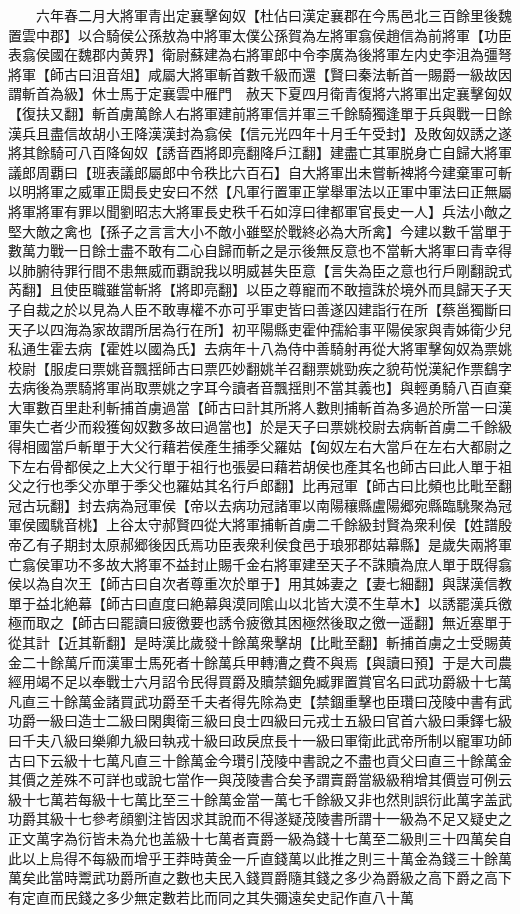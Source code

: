 　　六年春二月大將軍青出定襄擊匈奴【杜佔曰漢定襄郡在今馬邑北三百餘里後魏置雲中郡】以合騎侯公孫敖為中將軍太僕公孫賀為左將軍翕侯趙信為前將軍【功臣表翕侯國在魏郡内黄界】衛尉蘇建為右將軍郎中令李廣為後將軍左内史李沮為彊弩將軍【師古曰沮音俎】咸屬大將軍斬首數千級而還【賢曰秦法斬首一賜爵一級故因謂斬首為級】休士馬于定襄雲中雁門　赦天下夏四月衛青復將六將軍出定襄擊匈奴【復扶又翻】斬首虜萬餘人右將軍建前將軍信并軍三千餘騎獨逢單于兵與戰一日餘漢兵且盡信故胡小王降漢漢封為翕侯【信元光四年十月壬午受封】及敗匈奴誘之遂將其餘騎可八百降匈奴【誘音酉將即亮翻降戶江翻】建盡亡其軍脱身亡自歸大將軍議郎周覇曰【班表議郎屬郎中令秩比六百石】自大將軍出未嘗斬裨將今建棄軍可斬以明將軍之威軍正閎長史安曰不然【凡軍行置軍正掌舉軍法以正軍中軍法曰正無屬將軍將軍有罪以聞劉昭志大將軍長史秩千石如淳曰律都軍官長史一人】兵法小敵之堅大敵之禽也【孫子之言言大小不敵小雖堅於戰終必為大所禽】今建以數千當單于數萬力戰一日餘士盡不敢有二心自歸而斬之是示後無反意也不當斬大將軍曰青幸得以肺腑待罪行間不患無威而覇說我以明威甚失臣意【言失為臣之意也行戶剛翻說式芮翻】且使臣職雖當斬將【將即亮翻】以臣之尊寵而不敢擅誅於境外而具歸天子天子自裁之於以見為人臣不敢專權不亦可乎軍吏皆曰善遂囚建詣行在所【蔡邕獨斷曰天子以四海為家故謂所居為行在所】初平陽縣吏霍仲孺給事平陽侯家與青姊衛少兒私通生霍去病【霍姓以國為氏】去病年十八為侍中善騎射再從大將軍擊匈奴為票姚校尉【服䖍曰票姚音飄揺師古曰票匹妙翻姚羊召翻票姚勁疾之貌苟悦漢紀作票鷂字去病後為票騎將軍尚取票姚之字耳今讀者音飄揺則不當其義也】與輕勇騎八百直棄大軍數百里赴利斬捕首虜過當【師古曰計其所將人數則捕斬首為多過於所當一曰漢軍失亡者少而殺獲匈奴數多故曰過當也】於是天子曰票姚校尉去病斬首虜二千餘級得相國當戶斬單于大父行藉若侯產生捕季父羅姑【匈奴左右大當戶在左右大都尉之下左右骨都侯之上大父行單于祖行也張晏曰藉若胡侯也產其名也師古曰此人單于祖父之行也季父亦單于季父也羅姑其名行戶郎翻】比再冠軍【師古曰比頻也比毗至翻冠古玩翻】封去病為冠軍侯【帝以去病功冠諸軍以南陽穰縣盧陽郷宛縣臨駣聚為冠軍侯國駣音桃】上谷太守郝賢四從大將軍捕斬首虜二千餘級封賢為衆利侯【姓譜殷帝乙有子期封太原郝郷後因氏焉功臣表衆利侯食邑于琅邪郡姑幕縣】是歲失兩將軍亡翕侯軍功不多故大將軍不益封止賜千金右將軍建至天子不誅贖為庶人單于既得翕侯以為自次王【師古曰自次者尊重次於單于】用其姊妻之【妻七細翻】與謀漢信教單于益北絶幕【師古曰直度曰絶幕與漠同隂山以北皆大漠不生草木】以誘罷漢兵徼極而取之【師古曰罷讀曰疲徼要也誘令疲徼其困極然後取之徼一遥翻】無近塞單于從其計【近其靳翻】是時漢比歲發十餘萬衆擊胡【比毗至翻】斬捕首虜之士受賜黄金二十餘萬斤而漢軍士馬死者十餘萬兵甲轉漕之費不與焉【與讀曰預】于是大司農經用竭不足以奉戰士六月詔令民得買爵及贖禁錮免臧罪置賞官名曰武功爵級十七萬凡直三十餘萬金諸買武功爵至千夫者得先除為吏【禁錮重擊也臣瓚曰茂陵中書有武功爵一級曰造士二級曰閑輿衛三級曰良士四級曰元戎士五級曰官首六級曰秉鐸七級曰千夫八級曰樂卿九級曰執戎十級曰政戾庶長十一級曰軍衛此武帝所制以寵軍功師古曰下云級十七萬凡直三十餘萬金今瓚引茂陵中書說之不盡也貢父曰直三十餘萬金其價之差殊不可詳也或說七當作一與茂陵書合矣予謂賣爵當級級稍增其價豈可例云級十七萬若每級十七萬比至三十餘萬金當一萬七千餘級又非也然則誤衍此萬字盖武功爵其級十七參考顔劉注皆因求其說而不得遂疑茂陵書所謂十一級為不足又疑史之正文萬字為衍皆未為允也盖級十七萬者賣爵一級為錢十七萬至二級則三十四萬矣自此以上烏得不每級而增乎王莽時黄金一斤直錢萬以此推之則三十萬金為錢三十餘萬萬矣此當時鬻武功爵所直之數也夫民入錢買爵隨其錢之多少為爵級之高下爵之高下有定直而民錢之多少無定數若比而同之其失彌遠矣史記作直八十萬